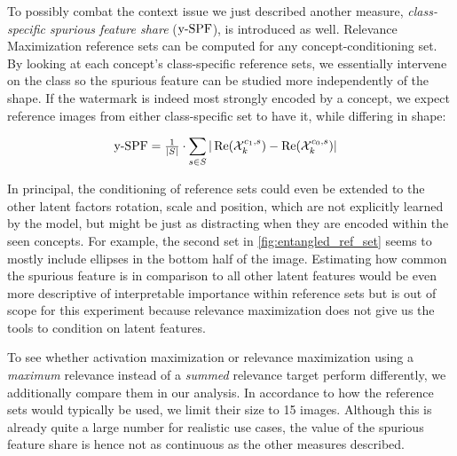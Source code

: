 To possibly combat the context issue we just described another measure, \textit{class-specific spurious feature share} ($\operatorname*{y-SPF}$), is introduced as well. 
Relevance Maximization reference sets can be computed for any concept-conditioning set. 
By looking at each concept's class-specific reference sets, we essentially intervene on the class so the spurious feature can be studied more independently of the shape. If the watermark is indeed most strongly encoded by a concept, we expect reference images from either class-specific set to have it, while differing in shape:

\begin{align}\displaystyle
& \operatorname*{y-SPF} =\tfrac{1}{|S|} \cdot
\sum_{s \in S} | \operatorname*{Re}(\mathcal{X}_k^{c_1, s}) - \operatorname*{Re}(\mathcal{X}_k^{c_0, s})| & 
\end{align}

In principal, the conditioning of reference sets could even be extended to the other latent factors rotation, scale and position, which are not explicitly learned by the model, but might be just as distracting when they are encoded within the seen concepts. For example, the second set in \cref{fig:entangled_ref_set} seems to mostly include ellipses in the bottom half of the image. Estimating how common the spurious feature is in comparison to all other latent features would be even more descriptive of interpretable importance within reference sets but is out of scope for this experiment because relevance maximization does not give us the tools to condition on latent features.

To see whether activation maximization or relevance maximization using a \textit{maximum} relevance instead of a \textit{summed} relevance target perform differently, we additionally compare them in our analysis. In accordance to how the reference sets would typically be used, we limit their size to 15 images. Although this is already quite a large number for realistic use cases, the value of the spurious feature share is hence not as continuous as the other measures described. 


